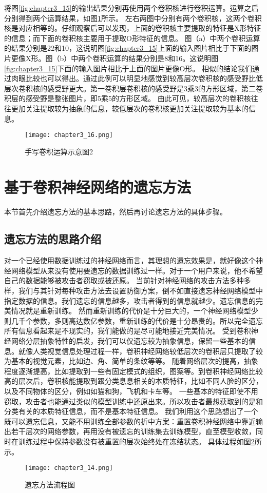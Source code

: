 将图\ref{fig:chapter3_15}的输出结果分别再使用两个卷积核进行卷积运算。运算之后分别得到两个运算结果，如图\ref{fig:chapter3_16}所示。
左右两图中分别有两个卷积核，这两个卷积核是对应相等的。仔细观察后可以发现，上面的卷积核主要提取的特征是X形特征的信息；而下面的卷积核主要用于提取O形特征的信息。
图（a）中两个卷积运算的结果分别是22和10，这说明图\ref{fig:chapter3_15}上面的输入图片相比于下面的图片更像X形。图（b）中两个卷积运算的结果分别是8和16。这说明图\ref{fig:chapter3_15}下面的输入图片相比于上面的图片更像O形。
相似的结论我们通过肉眼比较也可以得出。通过此例可以明显地感觉到较高层次卷积核的感受野比低层次卷积核的感受野更大。第一卷积层卷积核的感受野是3乘3的方形区域，第二卷积层的感受野是整张图片，即5乘5的方形区域。
由此可见，较高层次的卷积核往往更加关注提取较为抽象的信息，较低层次的卷积核更加关注提取较为基本的信息。
\begin{figure}
    \centering
    \texttt{[image: chapter3\_16.png]}
    \caption{手写卷积运算示意图2}
    \label{fig:chapter3_16}
\end{figure}

\section{基于卷积神经网络的遗忘方法}
本节首先介绍遗忘方法的基本思路，然后再讨论遗忘方法的具体步骤。
\subsection{遗忘方法的思路介绍}
对一个已经使用数据训练过的神经网络而言，其理想的遗忘效果是，就好像这个神经网络模型从来没有使用要遗忘的数据训练过一样。对于一个用户来说，他不希望自己的数据能够被攻击者窃取或被还原。
当前针对神经网络的攻击方法多种多样，我们与其针对每种攻击方法去设置防御方案，倒不如直接遗忘神经网络模型中指定数据的信息。我们遗忘的信息越多，攻击者得到的信息就越少。遗忘信息的完美情况就是重新训练。
然而重新训练的代价是十分巨大的，一个神经网络模型少则几千个参数，多则高达数亿参数，重新训练的代价是十分昂贵的。所以完全遗忘所有信息看起来是不现实的，我们能做的是尽可能地接近完美情况。
受到卷积神经网络分层抽象特性的启发，我们可以仅遗忘较为抽象信息，保留一些基本的信息。就像人类视觉信息处理过程一样，卷积神经网络较低层次的卷积层只提取了较为基本的视觉元素，比如边、角、简单的条纹等等。
随着网络层次的提高，抽象程度逐渐提高，比如提取到一些有固定模式的组织，图案等。到卷积神经网络比较高的层次后，卷积核能提取到跟分类息息相关的本质特征，比如不同人脸的区分，以及不同物体的区分，例如如猫和狗，飞机和卡车等。
一些基本的特征即使不用窃取，攻击者也能通过类似的模型训练中还原出来。所以攻击者最想获取到的是和分类有关的本质特征信息，而不是基本特征信息。
我们利用这个思路想出了一个既可以遗忘信息，又能不用训练全部参数的折中方案：重置卷积神经网络中靠近输出若干层次的网络参数，再用没有被遗忘的训练集去训练模型，直至模型收敛，同时在训练过程中保持参数没有被重置的层次始终处在冻结状态。
具体过程如图\ref{fig:chapter3_14}所示。
\begin{figure}
    \centering
    \texttt{[image: chapter3\_14.png]}
    \caption{遗忘方法流程图}
    \label{fig:chapter3_14}
\end{figure}

